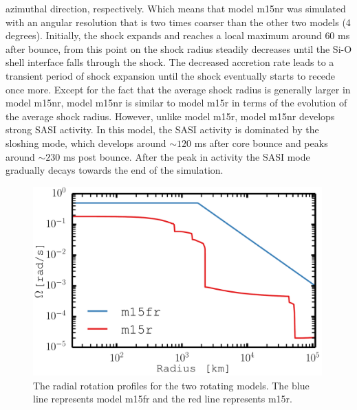 \begin{itemize}
azimuthal direction, respectively. Which means that model m15nr was simulated with an angular resolution that is
two times coarser than the other two models (4 degrees). Initially, the shock expands and reaches a local maximum around $60$ ms after bounce,
from this point on the shock radius steadily decreases until the Si-O shell interface falls through the shock. The decreased accretion rate
leads to a transient period of shock expansion until the shock eventually starts to recede once more. Except for the fact that
the average shock radius is generally larger in model m15nr, model m15nr is similar to model m15r in terms of the evolution of the average shock
radius. However, unlike model m15r, model m15nr develops strong SASI activity. In this model, the SASI activity is dominated by the sloshing mode,
which develops around $\sim 120$ ms after core bounce and peaks around $\sim 230$ ms post bounce. After the peak in activity 
the SASI mode gradually decays towards the end of the simulation.   
\end{itemize}
\begin{figure}[ht]           
\centering                            
\includegraphics[width=0.99\textwidth]{./images/paper2/rot.pdf}
\caption{The radial rotation profiles for the two rotating models. The blue line represents model 
m15fr and the red line represents m15r. \label{figp2:rot}}
\end{figure}
